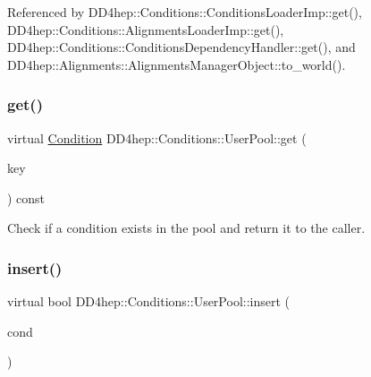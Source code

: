 Referenced by D\+D4hep\+::\+Conditions\+::\+Conditions\+Loader\+Imp\+::get(), D\+D4hep\+::\+Conditions\+::\+Alignments\+Loader\+Imp\+::get(), D\+D4hep\+::\+Conditions\+::\+Conditions\+Dependency\+Handler\+::get(), and D\+D4hep\+::\+Alignments\+::\+Alignments\+Manager\+Object\+::to\+\_\+world().

\hypertarget{class_d_d4hep_1_1_conditions_1_1_user_pool_a1b03fc2a7215f2e88739d4ecfb4f073a}{}\label{class_d_d4hep_1_1_conditions_1_1_user_pool_a1b03fc2a7215f2e88739d4ecfb4f073a} 
\subsubsection{\texorpdfstring{get()}{get()}\hspace{0.1cm}{\footnotesize\ttfamily [2/2]}}
{\footnotesize\ttfamily virtual \hyperlink{class_d_d4hep_1_1_conditions_1_1_condition}{Condition} D\+D4hep\+::\+Conditions\+::\+User\+Pool\+::get (\begin{DoxyParamCaption}\item[{const \hyperlink{class_d_d4hep_1_1_conditions_1_1_condition_key}{Condition\+Key} \&}]{key }\end{DoxyParamCaption}) const\hspace{0.3cm}{\ttfamily [pure virtual]}}



Check if a condition exists in the pool and return it to the caller. 

\hypertarget{class_d_d4hep_1_1_conditions_1_1_user_pool_af25760694df2897b8998fcf65ced5a18}{}\label{class_d_d4hep_1_1_conditions_1_1_user_pool_af25760694df2897b8998fcf65ced5a18} 
\subsubsection{\texorpdfstring{insert()}{insert()}}
{\footnotesize\ttfamily virtual bool D\+D4hep\+::\+Conditions\+::\+User\+Pool\+::insert (\begin{DoxyParamCaption}\item[{\hyperlink{class_d_d4hep_1_1_conditions_1_1_condition}{Condition}}]{cond }\end{DoxyParamCaption})\hspace{0.3cm}{\ttfamily [pure virtual]}}



